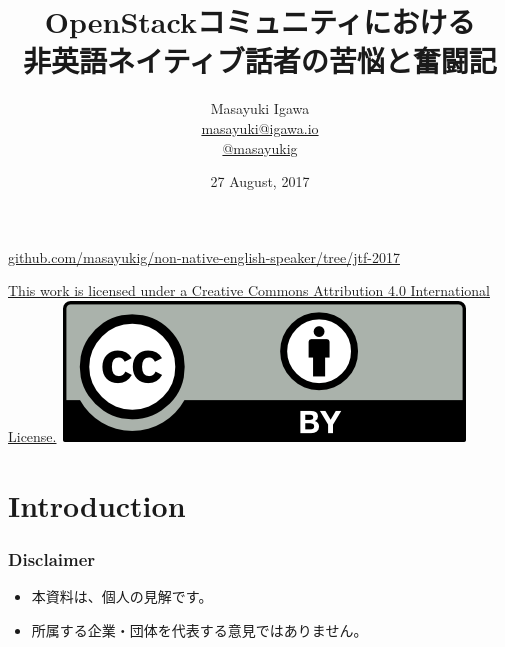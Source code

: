 \documentclass[aspectratio=169,11pt,hyperref={colorlinks=true}]{beamer}
\author[Dong Ma, Samuel de Medeiros and Masayuki Igawa]{%
  \texorpdfstring{%
    \centering
    Masayuki Igawa\\
    \href{mailto:masayuki@igawa.io}{masayuki@igawa.io}\\
    \href{https://twitter.com/masayukig}{@masayukig}
  }
  {Dong Ma, Samuel de Medeiros and Masayuki Igawa}
}
\date{27 August, 2017}
\title[Non-Native-English-Speaker
\hspace{2em}\insertframenumber/\inserttotalframenumber]{OpenStackコミュニティにおける\\非英語ネイティブ話者の苦悩と奮闘記}
\begin{document}
{%
\begin{frame}[noframenumbering]
  \hypersetup{colorlinks,urlcolor=suse}
  \titlepage{}
  \centering
  \@place \par
  \href{https://github.com/masayukig/non-native-english-speaker/tree/jtf-2017}{github.com/masayukig/non-native-english-speaker/tree/jtf-2017}\\
  \vspace{1em}
  \begin{flushright}
    \tiny\href{https://creativecommons.org/licenses/by/4.0/}{This work
      is licensed under a Creative Commons Attribution 4.0
      International License.}~\includegraphics[scale=0.3]{cc_by.png}
  \end{flushright}
\end{frame}
}


\section{Introduction}
\begin{frame}
  \frametitle{Disclaimer}
  \begin{itemize}
    \item 本資料は、個人の見解です。
    \item 所属する企業・団体を代表する意見ではありません。
  \end{itemize}
\end{frame}
\end{document}

